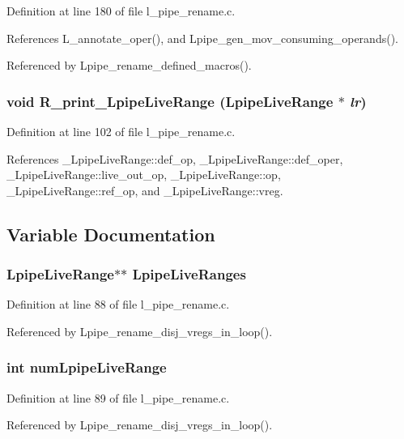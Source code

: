 Definition at line 180 of file l\_\-pipe\_\-rename.c.

References L\_\-annotate\_\-oper(), and Lpipe\_\-gen\_\-mov\_\-consuming\_\-operands().

Referenced by Lpipe\_\-rename\_\-defined\_\-macros().
\subsubsection{\setlength{\rightskip}{0pt plus 5cm}void R\_\-print\_\-Lpipe\-Live\-Range (\bf{Lpipe\-Live\-Range} $\ast$ {\em lr})}\label{l__pipe__rename_8c_cc5acf4c525363e77a2c0e38dbe31139}




Definition at line 102 of file l\_\-pipe\_\-rename.c.

References \_\-Lpipe\-Live\-Range::def\_\-op, \_\-Lpipe\-Live\-Range::def\_\-oper, \_\-Lpipe\-Live\-Range::live\_\-out\_\-op, \_\-Lpipe\-Live\-Range::op, \_\-Lpipe\-Live\-Range::ref\_\-op, and \_\-Lpipe\-Live\-Range::vreg.

\subsection{Variable Documentation}
\subsubsection{\setlength{\rightskip}{0pt plus 5cm}\bf{Lpipe\-Live\-Range}$\ast$$\ast$ \bf{Lpipe\-Live\-Ranges}\hspace{0.3cm}{\tt  [static]}}\label{l__pipe__rename_8c_32c2b4ca644c1642c0d5681fcb3ab0a1}




Definition at line 88 of file l\_\-pipe\_\-rename.c.

Referenced by Lpipe\_\-rename\_\-disj\_\-vregs\_\-in\_\-loop().
\subsubsection{\setlength{\rightskip}{0pt plus 5cm}int \bf{num\-Lpipe\-Live\-Range}\hspace{0.3cm}{\tt  [static]}}\label{l__pipe__rename_8c_653b8519151fd1e1c24fe18695b3c87f}




Definition at line 89 of file l\_\-pipe\_\-rename.c.

Referenced by Lpipe\_\-rename\_\-disj\_\-vregs\_\-in\_\-loop().